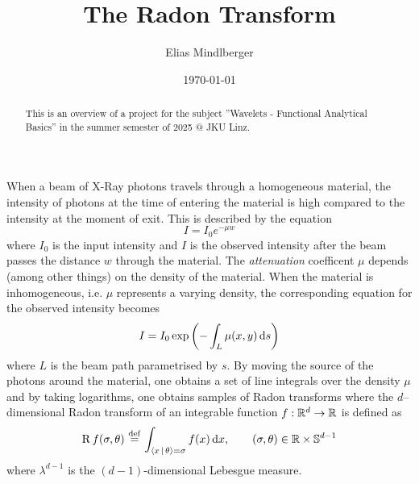 \documentclass[a4paper,12pt]{amsart}
\begin{document}
\title{The Radon Transform}
\author{Elias Mindlberger}


\date{\today}

\begin{abstract}
    This is an overview of a project for the subject ''Wavelets - Functional Analytical Basics'' in the summer semester of 2025 @ JKU Linz.
\end{abstract}

\maketitle


When a beam of X-Ray photons travels through a homogeneous material, the intensity of photons at the time of entering the material is high compared to the intensity at the moment of exit. This is described by the equation
\[
    I = I_0 e^{-\mu w}
\]
where \(I_0\) is the input intensity and 
\(I\) is the observed intensity after the beam passes the 
distance \(w\) through the material. The \emph{attenuation} coefficent \(\mu\) 
depends (among other things) on the density of the material.
When the material is inhomogeneous, i.e. \(\mu\) represents a varying density, the 
corresponding equation for the observed intensity becomes \[
    I = I_0 \exp \left( - \int_{L}^{} \mu(x,y)\, \mathrm{d} s \right)
\]
where \(L\) is the beam path parametrised by \(s\). By moving the source of the photons around the material, one obtains a set of line integrals over the density \(\mu\) and by taking logarithms, one obtains
samples of Radon transforms where the \(d\)--dimensional Radon transform of an integrable function \(f: \mathbb{R}^d \to \mathbb{R}\) is defined as
\[
    \operatorname{R} f(\sigma, \theta) \operatorname{\, \stackrel{def}{=} \,} \int_{\left\langle x\, \mid\, \theta \right\rangle = \sigma}^{} f(x)\, \mathrm{d} x,\qquad (\sigma, \theta) \in \mathbb{R} \times \mathbb{S}^{d-1}
\]
where \(\lambda^{d-1}\) is the \((d-1)\)-dimensional Lebesgue measure.
\end{document}
